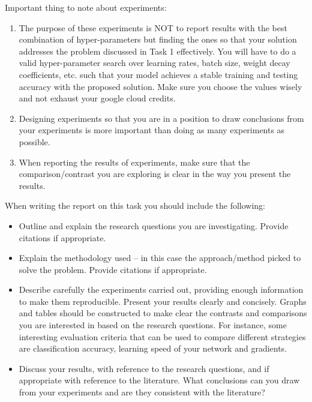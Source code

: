 \documentclass[11pt,]{article}
\begin{document}
Important thing to note about experiments:
\begin{enumerate}
    \item The purpose of these experiments is NOT to report results with the best combination of hyper-parameters but finding the ones so that your solution addresses the problem discussed in Task 1 effectively. You will have to do a valid hyper-parameter search over learning rates, batch size, weight decay coefficients, etc. such that your model achieves a stable training and testing accuracy with the proposed solution. Make sure you choose the values wisely and not exhaust your google cloud credits. 
    \item Designing experiments so that you are in a position to draw conclusions from your experiments is more important than doing as many experiments as possible.
    \item When reporting the results of experiments, make sure that the comparison/contrast you are exploring is clear in the way you present the results.
\end{enumerate}

When writing the report on this task you should include the following:
\begin{itemize}
    \item Outline and explain the research questions you are investigating.  Provide citations if appropriate.
    \item Explain the methodology used -- in this case the approach/method picked to solve the problem. Provide citations if appropriate.
    \item Describe carefully the experiments carried out, providing enough information to make them reproducible.  Present your results clearly and concisely.  Graphs and tables should be constructed to make clear the contrasts and comparisons you are interested in based on the research questions. For instance, some interesting evaluation criteria that can be used to compare different strategies are classification accuracy, learning speed of your network and gradients.
    \item Discuss your results, with reference to the research questions, and if appropriate with reference to the literature.  What conclusions can you draw from your experiments and are they consistent with the literature?
\end{itemize}
\end{document}
